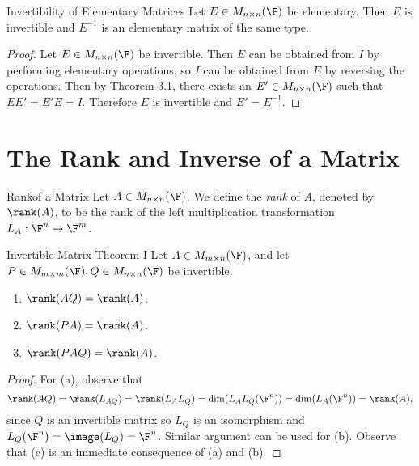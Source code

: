 \documentclass[linearalgebraI]{subfiles}
\begin{document}
    \begin{prop}{Invertibility of Elementary Matrices}
        Let $E\in M_{n\times n}(\F)$ be elementary. Then $E$ is invertible and $E^{-1}$ is an elementary matrix of the same type.
    \end{prop}

    \begin{proof}
        Let $E\in M_{n\times n}(\F)$ be invertible. Then $E$ can be obtained from $I$ by performing elementary operations, so $I$ can be obtained from $E$ by reversing the operations. Then by Theorem 3.1, there exists an $E'\in M_{n\times n}(\F)$ such that $EE'=E'E=I$. Therefore $E$ is invertible and $E' = E^{-1}$.
    \end{proof}

    \section{The Rank and Inverse of a Matrix}
    
    \begin{definition}{Rank}{of a Matrix}
        Let $A\in M_{n\times n}(\F)$. We define the \emph{rank} of $A$, denoted by $\rank(A)$, to be the rank of the left multiplication transformation $L_A: \F^n\to \F^m$.
    \end{definition}

    \begin{theorem}{Invertible Matrix Theorem I}
        Let $A\in M_{m\times n}(\F)$, and let $P\in M_{m\times m}(\F), Q\in M_{n\times n}(\F)$ be invertible. 
        \begin{enumerate}
            \item $\rank(AQ) = \rank(A)$. 
            \item $\rank(PA) = \rank(A)$. 
            \item $\rank(PAQ) = \rank(A)$.
        \end{enumerate}
    \end{theorem}
    
    \begin{proof}
        For (a), observe that 
        \begin{equation*}
            \rank(AQ) = \rank(L_{AQ}) = \rank(L_AL_Q) = \dim (L_AL_Q(\F^n)) = \dim(L_A(\F^n)) = \rank(A),
        \end{equation*}
        since $Q$ is an invertible matrix so $L_Q$ is an isomorphism and $L_Q(\F^n) = \image(L_Q) = \F^n$. Similar argument can be used for (b). Observe that (c) is an immediate consequence of (a) and (b).
    \end{proof}
\end{document}
